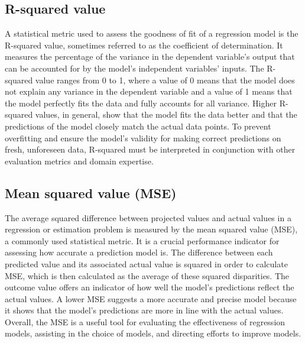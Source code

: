 \documentclass[a4paper,11pt]{report}%
\renewcommand{\\}{\vspace*{0.5\baselineskip} \newline}
\begin{document}
\subsection{R-squared value}
A statistical metric used to assess the goodness of fit of a regression model is the R-squared value, sometimes referred to as the coefficient of determination. It measures the percentage of the variance in the dependent variable's output that can be accounted for by the model's independent variables' inputs. The R-squared value ranges from 0 to 1, where a value of 0 means that the model does not explain any variance in the dependent variable and a value of 1 means that the model perfectly fits the data and fully accounts for all variance. Higher R-squared values, in general, show that the model fits the data better and that the predictions of the model closely match the actual data points. To prevent overfitting and ensure the model's validity for making correct predictions on fresh, unforeseen data, R-squared must be interpreted in conjunction with other evaluation metrics and domain expertise.


\subsection{Mean squared value (MSE)}
The average squared difference between projected values and actual values in a regression or estimation problem is measured by the mean squared value (MSE), a commonly used statistical metric. It is a crucial performance indicator for assessing how accurate a prediction model is. The difference between each predicted value and its associated actual value is squared in order to calculate MSE, which is then calculated as the average of these squared disparities. The outcome value offers an indicator of how well the model's predictions reflect the actual values. A lower MSE suggests a more accurate and precise model because it shows that the model's predictions are more in line with the actual values. 
Overall, the MSE is a useful tool for evaluating the effectiveness of regression models, assisting in the choice of models, and directing efforts to improve models.
\end{document}
